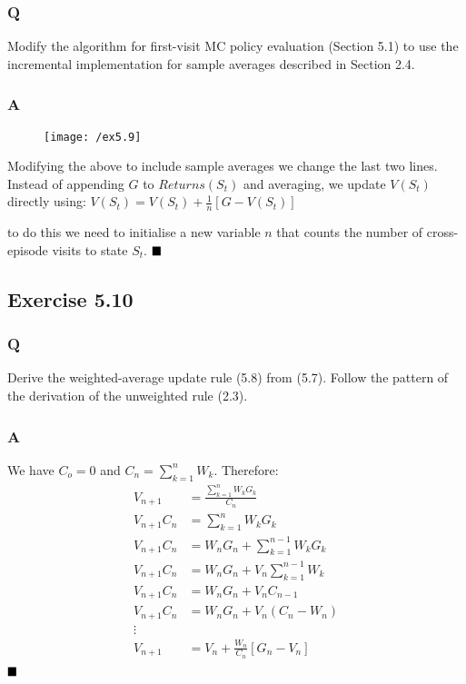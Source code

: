 \subsubsection{Q}
Modify the algorithm for first-visit MC policy evaluation (Section 5.1) to use the incremental implementation for sample averages described in Section 2.4. 
\subsubsection{A}
\begin{figure}[h!]
	\centering
	\texttt{[image: /ex5.9]}
	\label{fig:monte carlo policy eval}
\end{figure}

Modifying the above to include sample averages we change the last two lines. Instead of appending $G$ to $Returns(S_t)$ and averaging, we update $V(S_t)$ directly using:
$
V(S_t) = V(S_t) + \frac{1}{n}\left[G - V(S_t)\right]
$

to do this we need to initialise a new variable $n$ that counts the number of cross-episode visits to state $S_t$.
$
\hfill \blacksquare
$

\subsection{Exercise 5.10}
\subsubsection{Q}
Derive the weighted-average update rule (5.8) from (5.7). Follow the pattern of the derivation of the unweighted rule (2.3).
\subsubsection{A}
We have $C_o = 0$ and $C_n = \sum_{k=1}^{n} W_k$. Therefore:
\begin{align}
V_{n+1} &= \frac{\sum_{k=1}^{n}W_k G_k}{C_n}\\
V_{n+1}{C_n} &= \sum_{k=1}^{n}W_k G_k \\
V_{n+1}{C_n} &= W_n G_n + \sum_{k=1}^{n-1}W_k G_k \\
V_{n+1}{C_n} &= W_n G_n + V_n \sum_{k=1}^{n-1}W_k \\
V_{n+1}{C_n} &= W_n G_n + V_n C_{n-1} \\
V_{n+1}{C_n} &= W_n G_n + V_n \left(C_n - W_n\right) \\
\vdots \\
V_{n+1} &= V_n + \frac{W_n}{C_n}\left[G_n - V_n\right] \\
\end{align}
$
\hfill \blacksquare
$

